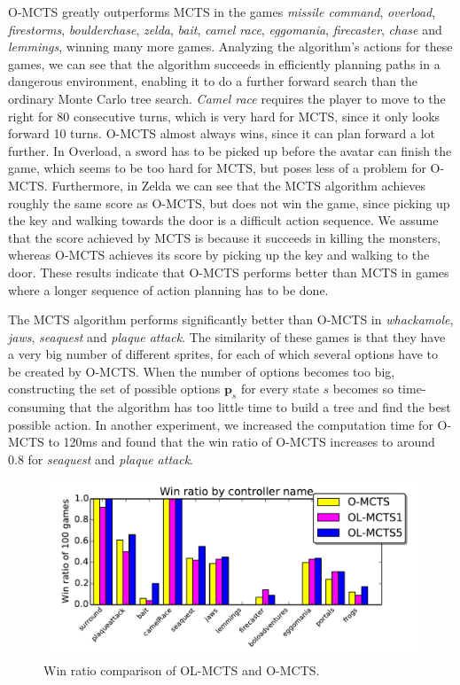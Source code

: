 O-MCTS greatly outperforms MCTS in the games \textit{missile
command}, \textit{overload}, \textit{firestorms}, \textit{boulderchase},
\textit{zelda}, \textit{bait}, \textit{camel race}, \textit{eggomania},
\textit{firecaster}, \textit{chase} and \textit{lemmings}, winning many more
games. Analyzing the algorithm's actions for these games, we can see that
the algorithm succeeds in efficiently planning paths in a dangerous environment,
enabling it to do a further forward search than the ordinary Monte Carlo tree
search. \textit{Camel race} requires the player to move to the right for 80
consecutive turns, which is very hard for MCTS, since it only looks forward 10 
turns. O-MCTS almost always wins, since it can plan forward a lot further. In
Overload, a sword has to be picked up before the avatar can finish the game,
which seems to be too hard for MCTS, but poses less of a problem for O-MCTS.
Furthermore, in Zelda we can see that the MCTS algorithm achieves roughly the
same score as O-MCTS, but does not win the game, since picking up the key and
walking towards the door is a difficult action sequence. We assume that the
score achieved by MCTS is because it succeeds in killing the monsters, whereas
O-MCTS achieves its score by picking up the key and walking to the door.  These
results indicate that O-MCTS performs better than MCTS in games where a longer
sequence of action planning has to be done.

The MCTS algorithm performs significantly better than O-MCTS in
\textit{whackamole}, \textit{jaws}, \textit{seaquest} and \textit{plaque
attack}. The similarity of these games is that they have a very big number of
different sprites, for each of which several options have to be created by
O-MCTS.  When the number of options becomes too big, constructing the set of
possible options $\mathbf{p}_s$ for every state $s$ becomes so time-consuming
that the algorithm has too little time to build a tree and find the best
possible action. In another experiment, we increased the computation time for
O-MCTS to 120ms and found that the win ratio of O-MCTS increases to around $0.8$
for \textit{seaquest} and \textit{plaque attack}.

\begin{figure}
	\centering
	\includegraphics[width=\columnwidth]{includes/winsOLMCTS}
	\vspace{-.8cm}
	\caption{Win ratio comparison of OL-MCTS and O-MCTS.}
	\label{fig:wins-olmcts}
\end{figure}

